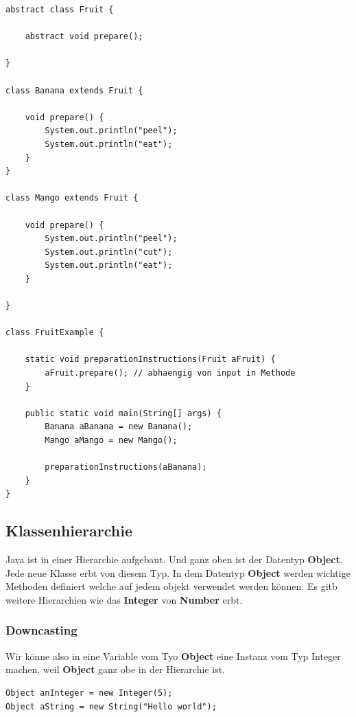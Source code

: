 \documentclass[12pt]{article}
\begin{document}
    \begin{lstlisting}[caption=Polymorphismus]
abstract class Fruit {

    abstract void prepare();
  
}

class Banana extends Fruit {

    void prepare() {
        System.out.println("peel");
        System.out.println("eat");
    }
}

class Mango extends Fruit {

    void prepare() {
        System.out.println("peel");
        System.out.println("cut");
        System.out.println("eat");
    }

}

class FruitExample {

    static void preparationInstructions(Fruit aFruit) {
        aFruit.prepare(); // abhaengig von input in Methode
    }

    public static void main(String[] args) {
        Banana aBanana = new Banana();
        Mango aMango = new Mango();

        preparationInstructions(aBanana);
    }
}
    \end{lstlisting}

    \subsection*{Klassenhierarchie}

    Java ist in einer Hierarchie aufgebaut. Und ganz oben ist der Datentyp \textbf{Object}. Jede neue Klasse erbt von diesem Typ. 
    In dem Datentyp \textbf{Object} werden wichtige Methoden definiert welche auf jedem objekt verwendet werden können. 
    Es gitb weitere Hierarchien wie das \textbf{Integer} von \textbf{Number} erbt. 


    \subsubsection*{Downcasting}

    Wir könne also in eine Variable vom Tyo \textbf{Object} eine Instanz vom Typ Integer machen, weil \textbf{Object} ganz obe in der Hierarchie ist. 

    \begin{lstlisting}[caption=erbt von Object]
Object anInteger = new Integer(5);
Object aString = new String("Hello world");
    \end{lstlisting}
\end{document}
